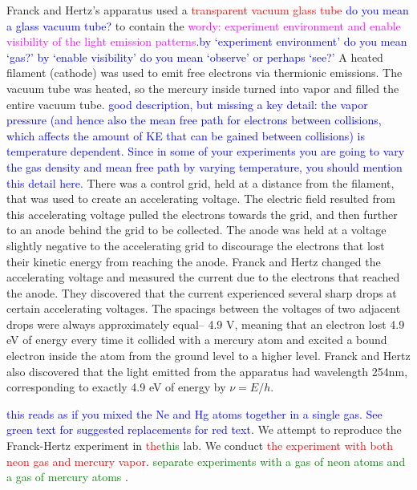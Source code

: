 \documentclass[prb,preprint]{revtex4-1}
\begin{document}
Franck and Hertz's apparatus used a \textcolor{red}{transparent vacuum glass tube} \textcolor{blue}{do you mean a glass vacuum tube?} to contain the \textcolor{magenta}{wordy: experiment environment and enable visibility of the light emission patterns}.\textcolor{blue}{by `experiment environment' do you mean `gas?' by `enable visibility' do you mean `observe' or perhaps `see?'} A heated filament (cathode) was used to emit free electrons via thermionic emissions. The vacuum tube was heated, so the mercury inside turned into vapor and filled the entire vacuum tube. \textcolor{blue}{good description, but missing a key detail: the vapor pressure (and hence also the mean free path for electrons between collisions, which affects the amount of KE that can be gained between collisions) is temperature dependent. Since in some of your experiments you are going to vary the gas density and mean free path by varying temperature, you should mention this detail here.} There was a control grid, held at a distance from the filament, that was used to create an accelerating voltage. The electric field resulted from this accelerating voltage pulled the electrons towards the grid, and then further to an anode behind the grid to be collected. The anode was held at a voltage slightly negative to the accelerating grid to discourage the electrons that lost their kinetic energy from reaching the anode. Franck and Hertz changed the accelerating voltage and measured the current due to the electrons that reached the anode. They discovered that the current experienced several sharp drops at certain accelerating voltages. The spacings between the voltages of two adjacent drops were always approximately equal-- 4.9 V, meaning that an electron lost 4.9 eV of energy every time it collided with a mercury atom and excited a bound electron inside the atom from the ground level to a higher level. Franck and Hertz also discovered that the light emitted from the apparatus had wavelength 254nm, corresponding to exactly 4.9 eV of energy by $\nu=E/h$.

\textcolor{blue}{this reads as if you mixed the Ne and Hg atoms together in a single gas. See  green text for suggested replacements for red text}. We attempt to reproduce the Franck-Hertz experiment in \textcolor{red}{the}\textcolor{green}{this}  lab. We conduct \textcolor{red}{the experiment with both neon gas and mercury vapor}. \textcolor{green}{separate experiments with a gas of neon atoms and a gas of mercury atoms }. 
\end{document}
